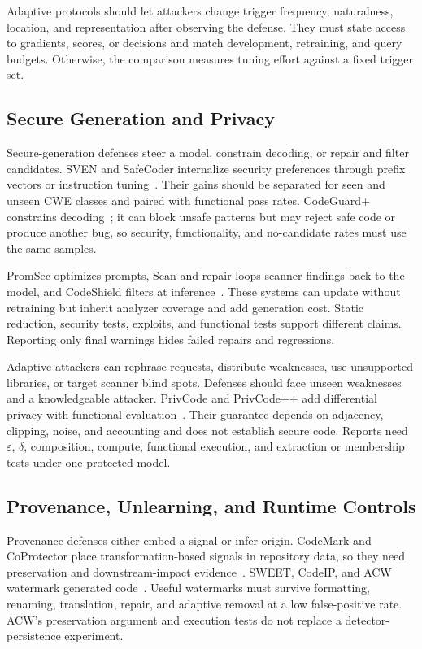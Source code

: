 \documentclass[acmsmall,screen,review]{acmart}
\begin{document}
Adaptive protocols should let attackers change trigger frequency, naturalness, location, and representation after observing the defense. They must state access to gradients, scores, or decisions and match development, retraining, and query budgets. Otherwise, the comparison measures tuning effort against a fixed trigger set.

\subsection{Secure Generation and Privacy} \label{sec:defense:gen}
Secure-generation defenses steer a model, constrain decoding, or repair and filter candidates. SVEN and SafeCoder internalize security preferences through prefix vectors or instruction tuning~\cite{he2023sven,he2024safecoder}. Their gains should be separated for seen and unseen CWE classes and paired with functional pass rates. CodeGuard+ constrains decoding~\cite{codeguard2024}; it can block unsafe patterns but may reject safe code or produce another bug, so security, functionality, and no-candidate rates must use the same samples.

PromSec optimizes prompts, Scan-and-repair loops scanner findings back to the model, and CodeShield filters at inference~\cite{promsec2024,guiding2025fix,codeshield2024}. These systems can update without retraining but inherit analyzer coverage and add generation cost. Static reduction, security tests, exploits, and functional tests support different claims. Reporting only final warnings hides failed repairs and regressions.

Adaptive attackers can rephrase requests, distribute weaknesses, use unsupported libraries, or target scanner blind spots. Defenses should face unseen weaknesses and a knowledgeable attacker. PrivCode and PrivCode++ add differential privacy with functional evaluation~\cite{privcode2026,privcodeplus2026}. Their guarantee depends on adjacency, clipping, noise, and accounting and does not establish secure code. Reports need $\varepsilon$, $\delta$, composition, compute, functional execution, and extraction or membership tests under one protected model.

\subsection{Provenance, Unlearning, and Runtime Controls}
Provenance defenses either embed a signal or infer origin. CodeMark and CoProtector place transformation-based signals in repository data, so they need preservation and downstream-impact evidence~\cite{codemark2023,coprotector2022}. SWEET, CodeIP, and ACW watermark generated code~\cite{lee2024sweet,guan2024codeip,li2024acw}. Useful watermarks must survive formatting, renaming, translation, repair, and adaptive removal at a low false-positive rate. ACW's preservation argument and execution tests do not replace a detector-persistence experiment.
\end{document}
